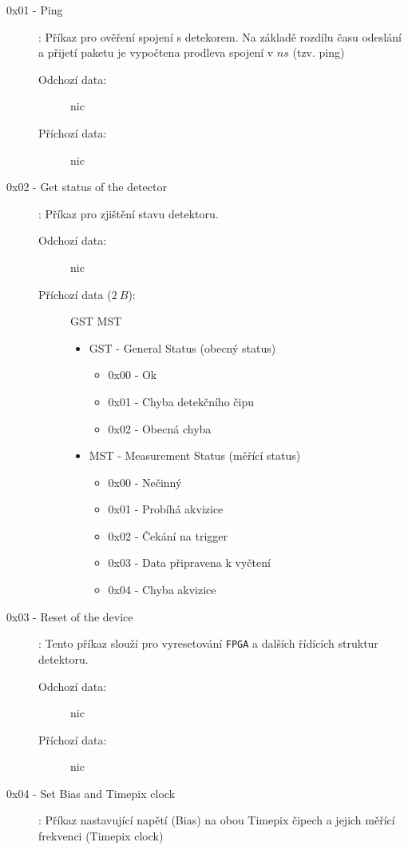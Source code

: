 \begin{description}
	\item[0x01 - Ping]:
		Příkaz pro ověření spojení s detekorem. Na základě rozdílu času odeslání a přijetí paketu je vypočtena prodleva spojení v $ns$ (tzv. ping)
		\begin{description}
			\item[Odchozí data:] nic
			\item[Příchozí data:] nic
		\end{description}
	\item[0x02 - Get status of the detector]:
		Příkaz pro zjištění stavu detektoru.	
		\begin{description}
			\item[Odchozí data:] nic
			\item[Příchozí data ($2~B$):] GST MST
				\begin{itemize}
					\item GST - General Status (obecný status)
						\begin{itemize}
							\item 0x00 - Ok
							\item 0x01 - Chyba detekčního čipu
							\item 0x02 - Obecná chyba
						\end{itemize}
					\item MST - Measurement Status (měřící status)
						\begin{itemize}
							\item 0x00 - Nečinný
							\item 0x01 - Probíhá akvizice
							\item 0x02 - Čekání na trigger
							\item 0x03 - Data připravena k vyčtení
							\item 0x04 - Chyba akvizice
						\end{itemize}
				\end{itemize}
		\end{description}
	\item[0x03 - Reset of the device]:
		Tento příkaz slouží pro vyresetování \texttt{FPGA} a dalších řídících struktur detektoru.
		\begin{description}
			\item[Odchozí data:] nic
			\item[Příchozí data:] nic
		\end{description}
	\item[0x04 - Set Bias and Timepix clock]:
		Příkaz nastavující napětí (Bias) na obou Timepix čipech a jejich měřící frekvenci (Timepix clock)

\end{description}
